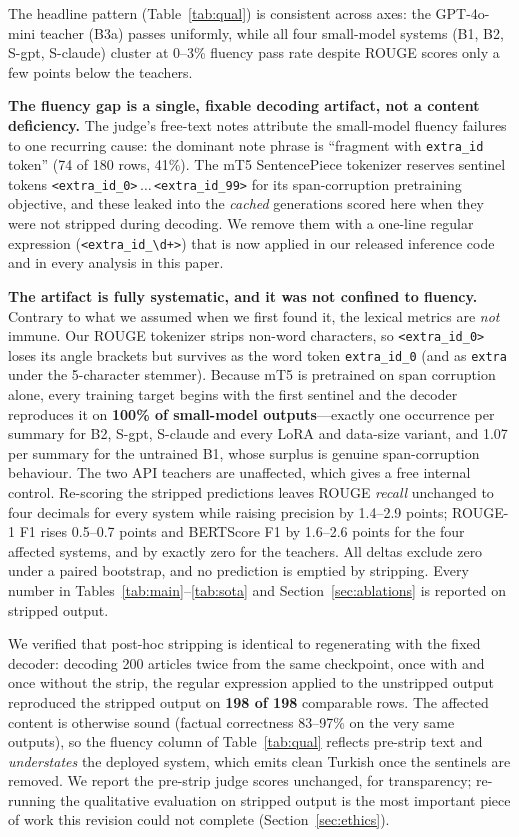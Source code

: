 \documentclass[conference]{IEEEtran}
\begin{document}
The headline pattern (Table~\ref{tab:qual}) is consistent across axes: the GPT-4o-mini teacher (B3a) passes uniformly, while all four small-model systems (B1, B2, S-gpt, S-claude) cluster at 0--3\% fluency pass rate despite ROUGE scores only a few points below the teachers.

\textbf{The fluency gap is a single, fixable decoding artifact, not a content deficiency.} The judge's free-text notes attribute the small-model fluency failures to one recurring cause: the dominant note phrase is ``fragment with \texttt{extra\_id} token'' (74 of 180 rows, 41\%). The mT5 SentencePiece tokenizer reserves sentinel tokens \texttt{<extra\_id\_0>}\,$\dots$\,\texttt{<extra\_id\_99>} for its span-corruption pretraining objective, and these leaked into the \emph{cached} generations scored here when they were not stripped during decoding. We remove them with a one-line regular expression (\texttt{<extra\_id\_\textbackslash d+>}) that is now applied in our released inference code and in every analysis in this paper.

\textbf{The artifact is fully systematic, and it was not confined to fluency.} Contrary to what we assumed when we first found it, the lexical metrics are \emph{not} immune. Our ROUGE tokenizer strips non-word characters, so \texttt{<extra\_id\_0>} loses its angle brackets but survives as the word token \texttt{extra\_id\_0} (and as \texttt{extra} under the 5-character stemmer). Because mT5 is pretrained on span corruption alone, every training target begins with the first sentinel and the decoder reproduces it on \textbf{100\% of small-model outputs}---exactly one occurrence per summary for B2, S-gpt, S-claude and every LoRA and data-size variant, and 1.07 per summary for the untrained B1, whose surplus is genuine span-corruption behaviour. The two API teachers are unaffected, which gives a free internal control. Re-scoring the stripped predictions leaves ROUGE \emph{recall} unchanged to four decimals for every system while raising precision by 1.4--2.9 points; ROUGE-1 F1 rises 0.5--0.7 points and BERTScore F1 by 1.6--2.6 points for the four affected systems, and by exactly zero for the teachers. All deltas exclude zero under a paired bootstrap, and no prediction is emptied by stripping. Every number in Tables~\ref{tab:main}--\ref{tab:sota} and Section~\ref{sec:ablations} is reported on stripped output.

We verified that post-hoc stripping is identical to regenerating with the fixed decoder: decoding 200 articles twice from the same checkpoint, once with and once without the strip, the regular expression applied to the unstripped output reproduced the stripped output on \textbf{198 of 198} comparable rows. The affected content is otherwise sound (factual correctness 83--97\% on the very same outputs), so the fluency column of Table~\ref{tab:qual} reflects pre-strip text and \emph{understates} the deployed system, which emits clean Turkish once the sentinels are removed. We report the pre-strip judge scores unchanged, for transparency; re-running the qualitative evaluation on stripped output is the most important piece of work this revision could not complete (Section~\ref{sec:ethics}).
\end{document}
